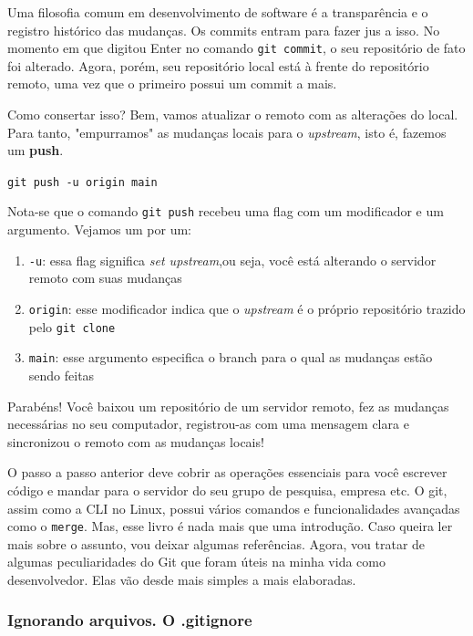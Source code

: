 \documentclass{article}
\begin{document}
  Uma filosofia comum em desenvolvimento de software é a transparência e o registro histórico das mudanças. Os commits entram
  para fazer jus a isso. No momento em que digitou Enter no comando \texttt{git commit}, o seu repositório de fato foi alterado. 
  Agora, porém, seu repositório local está à frente do repositório remoto, uma vez que o primeiro possui um commit a mais. 

  Como consertar isso? Bem, vamos atualizar o remoto com as alterações do local. Para tanto, "empurramos" as mudanças locais 
  para o \textit{upstream}, isto é, fazemos um \textbf{push}.

  \vspace{1ex}
  \texttt{git push -u origin main}
  \vspace{1ex}

  Nota-se que o comando \texttt{git push} recebeu uma flag com um modificador e um argumento. Vejamos um por um: 

  \begin{enumerate}
	\item{\texttt{-u}: essa flag significa \textit{set upstream},ou seja, você está alterando o servidor remoto com suas mudanças}
	\item{\texttt{origin}: esse modificador indica que o \textit{upstream} é o próprio repositório trazido pelo \texttt{git clone}}
	\item{\texttt{main}: esse argumento especifica o branch para o qual as mudanças estão sendo feitas}
  \end{enumerate}

  Parabéns! Você baixou um repositório de um servidor remoto, fez as mudanças necessárias no seu computador, registrou-as com uma
  mensagem clara e sincronizou o remoto com as mudanças locais!  


  O passo a passo anterior deve cobrir as operações essenciais para você escrever código e mandar para o servidor do seu grupo 
  de pesquisa, empresa etc. O git, assim como a CLI no Linux, possui vários comandos e funcionalidades avançadas como o \texttt{merge}.
  Mas, esse livro é nada mais que uma introdução. Caso queira ler mais sobre o assunto, vou deixar algumas referências. 
  Agora, vou tratar de algumas peculiaridades do Git que foram úteis na minha vida como desenvolvedor. Elas vão desde mais simples a 
  mais elaboradas. 

  \subsubsection{Ignorando arquivos. O .gitignore}
\end{document}
